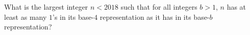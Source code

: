 What is the largest integer $n < 2018$ such that for all integers $b > 1$,  $n$ has at least as many $1$'s in its base-$4$ representation as it has in its base-$b$ representation?